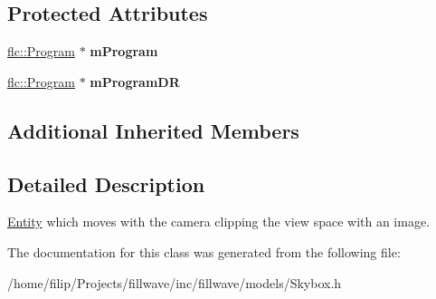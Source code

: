\subsection*{Protected Attributes}
\begin{DoxyCompactItemize}
\item 
\hyperlink{classflw_1_1flc_1_1Program}{flc\+::\+Program} $\ast$ {\bfseries m\+Program}\hypertarget{classflw_1_1flf_1_1Skybox_affba7dea849a2e53cb3a13ed96f677e7}{}\label{classflw_1_1flf_1_1Skybox_affba7dea849a2e53cb3a13ed96f677e7}

\item 
\hyperlink{classflw_1_1flc_1_1Program}{flc\+::\+Program} $\ast$ {\bfseries m\+Program\+DR}\hypertarget{classflw_1_1flf_1_1Skybox_a9b11959f2cbbcbadf92ee09acf185b06}{}\label{classflw_1_1flf_1_1Skybox_a9b11959f2cbbcbadf92ee09acf185b06}

\end{DoxyCompactItemize}
\subsection*{Additional Inherited Members}


\subsection{Detailed Description}
\hyperlink{classflw_1_1flf_1_1Entity}{Entity} which moves with the camera clipping the view space with an image. 

The documentation for this class was generated from the following file\+:\begin{DoxyCompactItemize}
\item 
/home/filip/\+Projects/fillwave/inc/fillwave/models/Skybox.\+h\end{DoxyCompactItemize}
